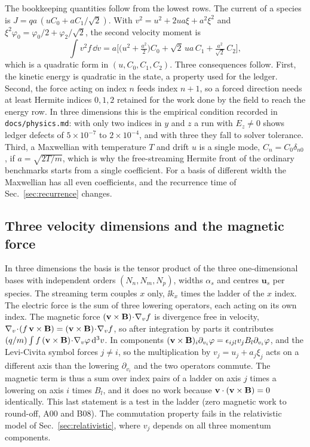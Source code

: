 The bookkeeping quantities follow from the lowest rows. The current of a species is $J=qa\,(uC_0+aC_1/\sqrt2)$. With $v^2=u^2+2ua\xi+a^2\xi^2$ and $\xi^2\varphi_0=\varphi_0/2+\varphi_2/\sqrt2$, the second velocity moment is
\begin{equation}
\int v^2f\,\dd v=a\Big[\big(u^2+\tfrac{a^2}{2}\big)C_0+\sqrt2\,ua\,C_1+\tfrac{a^2}{\sqrt2}\,C_2\Big],
\label{eq:v2moment}
\end{equation}
which is a quadratic form in $(u,C_0,C_1,C_2)$. Three consequences follow. First, the kinetic energy is quadratic in the state, a property used for the ledger. Second, the force acting on index $n$ feeds index $n+1$, so a forced direction needs at least Hermite indices $0,1,2$ retained for the work done by the field to reach the energy row. In three dimensions this is the empirical condition recorded in \texttt{docs/physics.md}: with only two indices in $y$ and $z$ a run with $E_z\neq0$ shows ledger defects of $5\times10^{-7}$ to $2\times10^{-4}$, and with three they fall to solver tolerance. Third, a Maxwellian with temperature $T$ and drift $u$ is a single mode, $C_n=C_0\delta_{n0}$, if $a=\sqrt{2T/m}$, which is why the free-streaming Hermite front of the ordinary benchmarks starts from a single coefficient. For a basis of different width the Maxwellian has all even coefficients, and the recurrence time of Sec.~\ref{sec:recurrence} changes.

\subsection{Three velocity dimensions and the magnetic force}

In three dimensions the basis is the tensor product of the three one-dimensional bases with independent orders $(N_n,N_m,N_p)$, widths $\alpha_s$ and centres $\mathbf u_s$ per species. The streaming term couples $x$ only, $\ii k_x$ times the ladder of the $x$ index. The electric force is the sum of three lowering operators, each acting on its own index. The magnetic force $(\mathbf{v}\times\mathbf{B})\!\cdot\!\nabla_vf$ is divergence free in velocity, $\nabla_v\!\cdot\!(f\,\mathbf{v}\times\mathbf{B})=(\mathbf{v}\times\mathbf{B})\!\cdot\!\nabla_vf$, so after integration by parts it contributes $(q/m)\int f\,(\mathbf{v}\times\mathbf{B})\!\cdot\!\nabla_v\varphi\,\mathrm{d}^3v$. In components $(\mathbf{v}\times\mathbf{B})_i\partial_{v_i}\varphi=\epsilon_{ijl}v_jB_l\partial_{v_i}\varphi$, and the Levi-Civita symbol forces $j\neq i$, so the multiplication by $v_j=u_j+a_j\xi_j$ acts on a different axis than the lowering $\partial_{v_i}$ and the two operators commute. The magnetic term is thus a sum over index pairs of a ladder on axis $j$ times a lowering on axis $i$ times $B_l$, and it does no work because $\mathbf{v}\cdot(\mathbf{v}\times\mathbf{B})=0$ identically. This last statement is a test in the ladder (zero magnetic work to round-off, A00 and B08). The commutation property fails in the relativistic model of Sec.~\ref{sec:relativistic}, where $v_j$ depends on all three momentum components.

